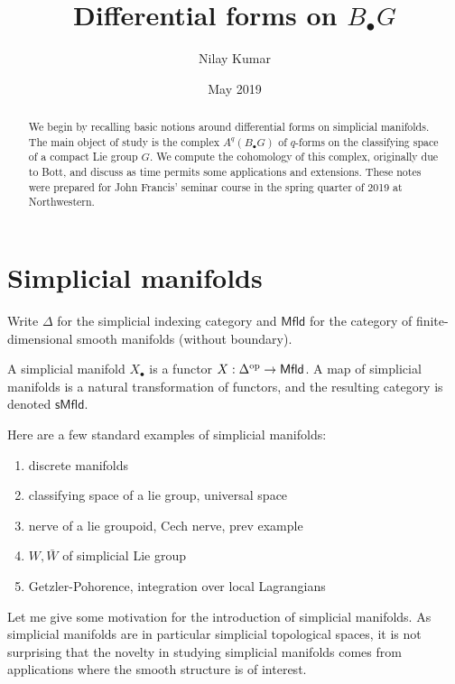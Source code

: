 \documentclass{amsart}
\title{Differential forms on $B_\bullet G$}
\author{Nilay Kumar}
\date{May 2019}
\begin{document}
\begin{abstract}
    We begin by recalling basic notions around differential forms on simplicial
    manifolds. The main object of study is the complex $A^q(B_\bullet G)$ of
    $q$-forms on the classifying space of a compact Lie group $G$. We compute
    the cohomology of this complex, originally due to Bott, and discuss as time
    permits some applications and extensions.
    These notes were prepared for John Francis' seminar course in the spring 
    quarter of 2019 at Northwestern.
\end{abstract}

\maketitle

\section{Simplicial manifolds}

Write $\Delta$ for the simplicial indexing category and $\mathsf{Mfld}$ for the 
category of finite-dimensional smooth manifolds (without boundary).

\begin{definition}
    A simplicial manifold $X_\bullet$ is a functor $X: \Delta^{\text{op}}\to 
    \mathsf{Mfld}$. A map of simplicial manifolds is a natural transformation of 
    functors, and the resulting category is denoted $\mathsf{sMfld}$.
\end{definition}

\begin{example}
    Here are a few standard examples of simplicial manifolds:
    \begin{enumerate}
        \item discrete manifolds
        \item classifying space of a lie group, universal space
        \item nerve of a lie groupoid, Cech nerve, prev example
        \item $W, \bar W$ of simplicial Lie group
        \item Getzler-Pohorence, integration over local Lagrangians
    \end{enumerate}
\end{example}

Let me give some motivation for the introduction of simplicial manifolds.
As simplicial manifolds are in particular simplicial topological spaces, it 
is not surprising that the novelty in studying simplicial manifolds comes from 
applications where the smooth structure is of interest.
\end{document}
